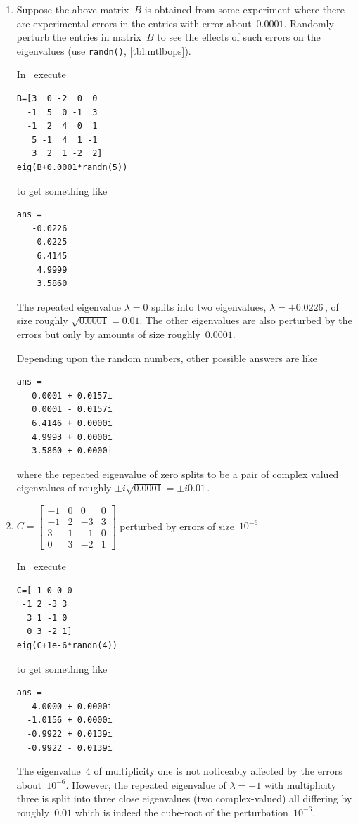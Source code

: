 \begin{example}
\begin{enumerate}
\item Suppose the above matrix~\(B\) is obtained from some experiment where there are experimental errors in the entries with error about~\(0.0001\).
Randomly perturb the entries in matrix~\(B\) to see the effects of such errors on the eigenvalues (use \verb|randn()|, \autoref{tbl:mtlbops}).
\begin{solution} 
In \script\ execute
\begin{verbatim}
B=[3  0 -2  0  0
  -1  5  0 -1  3
  -1  2  4  0  1
   5 -1  4  1 -1
   3  2  1 -2  2]
eig(B+0.0001*randn(5))
\end{verbatim}
\setbox\ajrqrbox\hbox{}%
\marginpar{\usebox{\ajrqrbox}}%
to get something like
\begin{verbatim}
ans =
   -0.0226
    0.0225
    6.4145
    4.9999
    3.5860
\end{verbatim}
The repeated eigenvalue \(\lambda=0\) splits into two eigenvalues, \(\lambda=\pm0.0226\)\,, of size roughly \(\sqrt{0.0001}=0.01\).
The other eigenvalues are also perturbed by the errors but only by amounts of size roughly~\(0.0001\).

Depending upon the random numbers, other possible answers are like
\begin{verbatim}
ans =
   0.0001 + 0.0157i
   0.0001 - 0.0157i
   6.4146 + 0.0000i
   4.9993 + 0.0000i
   3.5860 + 0.0000i
\end{verbatim}
where the repeated eigenvalue of zero splits to be a pair of complex valued eigenvalues of roughly \(\pm i\sqrt{0.0001}=\pm i0.01\)\,.
\end{solution}



\item \(C=\begin{bmatrix}-1&0&0&0
\\-1&2&-3&3
\\3&1&-1&0
\\0&3&-2&1\end{bmatrix}\) perturbed by errors of size~\(10^{-6}\)
\begin{solution} 
In \script\ execute
\begin{verbatim}
C=[-1 0 0 0
 -1 2 -3 3
  3 1 -1 0
  0 3 -2 1]
eig(C+1e-6*randn(4))
\end{verbatim}
\setbox\ajrqrbox\hbox{}%
\marginpar{\usebox{\ajrqrbox}}%
to get something like
\begin{verbatim}
ans =
   4.0000 + 0.0000i
  -1.0156 + 0.0000i
  -0.9922 + 0.0139i
  -0.9922 - 0.0139i
\end{verbatim}
The eigenvalue~\(4\) of multiplicity one is not noticeably affected by the errors about~\(10^{-6}\).
However, the repeated eigenvalue of \(\lambda=-1\) with multiplicity three is split into three close eigenvalues (two complex-valued) all differing by roughly~\(0.01\) which is indeed the cube-root of the perturbation~\(10^{-6}\).
\end{solution}


\end{enumerate}
\end{example}
